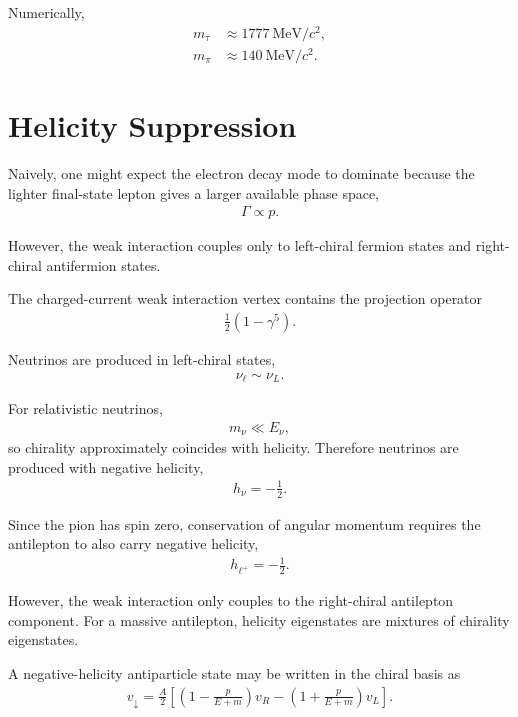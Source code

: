 Numerically,
\begin{align}
m_\tau &\approx 1777~\mathrm{MeV}/c^2,
\\
m_\pi &\approx 140~\mathrm{MeV}/c^2.
\end{align}

\section{Helicity Suppression}

Naively, one might expect the electron decay mode to dominate because the lighter final-state lepton gives a larger available phase space,
\begin{align}
\Gamma \propto p .
\end{align}

However, the weak interaction couples only to left-chiral fermion states and right-chiral antifermion states.

The charged-current weak interaction vertex contains the projection operator
\begin{align}
\frac{1}{2}(1-\gamma^5).
\end{align}

Neutrinos are produced in left-chiral states,
\begin{align}
\nu_\ell \sim \nu_L .
\end{align}

For relativistic neutrinos,
\begin{align}
m_\nu \ll E_\nu ,
\end{align}
so chirality approximately coincides with helicity. Therefore neutrinos are produced with negative helicity,
\begin{align}
h_\nu = -\frac{1}{2}.
\end{align}

Since the pion has spin zero, conservation of angular momentum requires the antilepton to also carry negative helicity,
\begin{align}
h_{\ell^+} = -\frac{1}{2}.
\end{align}

However, the weak interaction only couples to the right-chiral antilepton component. For a massive antilepton, helicity eigenstates are mixtures of chirality eigenstates.

A negative-helicity antiparticle state may be written in the chiral basis as
\begin{align}
v_\downarrow
=
\frac{A}{2}
\left[
\left(
1-\frac{p}{E+m}
\right)v_R
-
\left(
1+\frac{p}{E+m}
\right)v_L
\right].
\end{align}

